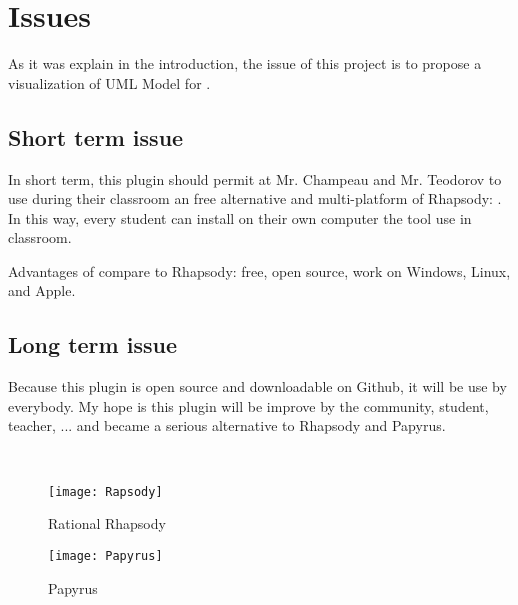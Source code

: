 
\chapter{Issues}
\label{chap:issues}


As it was explain in the introduction, the issue of this project is to propose a visualization of UML Model for \umld.

\section{Short term issue}

In short term, this plugin should permit at Mr. Champeau and Mr. Teodorov to use during their classroom an free alternative and multi-platform of Rhapsody: \umld. In this way, every student can install on their own computer the tool use in classroom.

Advantages of \umld compare to Rhapsody: free, open source, work on Windows, Linux, and Apple.

\section{Long term issue}

Because this plugin is open source and downloadable on Github, it will be use by everybody. My hope is this plugin will be improve by the community, student, teacher, \etc... and became a serious alternative to Rhapsody and Papyrus.

~\\

  \begin{figure}[h]
    \begin{minipage}{0.45\linewidth}
      \centering
      \texttt{[image: Rapsody]}
      \caption{Rational Rhapsody}
      \label{fig:rhapsody}
    \end{minipage}\hfill
    \begin{minipage}{0.45\linewidth}
      \centering
      \texttt{[image: Papyrus]}
      \caption{Papyrus}
      \label{fig:papyrus}
    \end{minipage}
  \end{figure}


